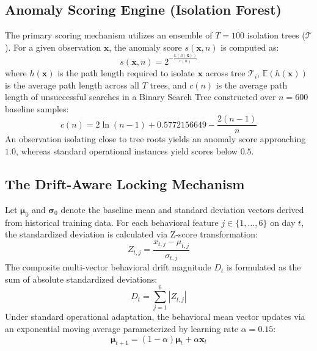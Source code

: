 \documentclass[conference]{IEEEtran}
\begin{document}
\subsection{Anomaly Scoring Engine (Isolation Forest)}
The primary scoring mechanism utilizes an ensemble of $T = 100$ isolation trees ($\mathcal{T}$). For a given observation $\mathbf{x}$, the anomaly score $s(\mathbf{x}, n)$ is computed as:
\begin{equation}
s(\mathbf{x}, n) = 2^{-\frac{\mathbb{E}(h(\mathbf{x}))}{c(n)}}
\label{eq:iforest}
\end{equation}
where $h(\mathbf{x})$ is the path length required to isolate $\mathbf{x}$ across tree $\mathcal{T}_i$, $\mathbb{E}(h(\mathbf{x}))$ is the average path length across all $T$ trees, and $c(n)$ is the average path length of unsuccessful searches in a Binary Search Tree constructed over $n = 600$ baseline samples:
\begin{equation}
c(n) = 2\ln(n - 1) + 0.5772156649 - \frac{2(n - 1)}{n}
\end{equation}
An observation isolating close to tree roots yields an anomaly score approaching $1.0$, whereas standard operational instances yield scores below $0.5$.

\subsection{The Drift-Aware Locking Mechanism}
Let $\boldsymbol{\mu}_0$ and $\boldsymbol{\sigma}_0$ denote the baseline mean and standard deviation vectors derived from historical training data. For each behavioral feature $j \in \{1, \dots, 6\}$ on day $t$, the standardized deviation is calculated via Z-score transformation:
\begin{equation}
Z_{t, j} = \frac{x_{t, j} - \mu_{t, j}}{\sigma_{t, j}}
\end{equation}
The composite multi-vector behavioral drift magnitude $D_t$ is formulated as the sum of absolute standardized deviations:
\begin{equation}
D_t = \sum_{j=1}^{6} |Z_{t, j}|
\label{eq:drift_sum}
\end{equation}
Under standard operational adaptation, the behavioral mean vector updates via an exponential moving average parameterized by learning rate $\alpha = 0.15$:
\begin{equation}
\boldsymbol{\mu}_{t+1} = (1 - \alpha)\boldsymbol{\mu}_t + \alpha \mathbf{x}_t
\end{equation}
\end{document}
